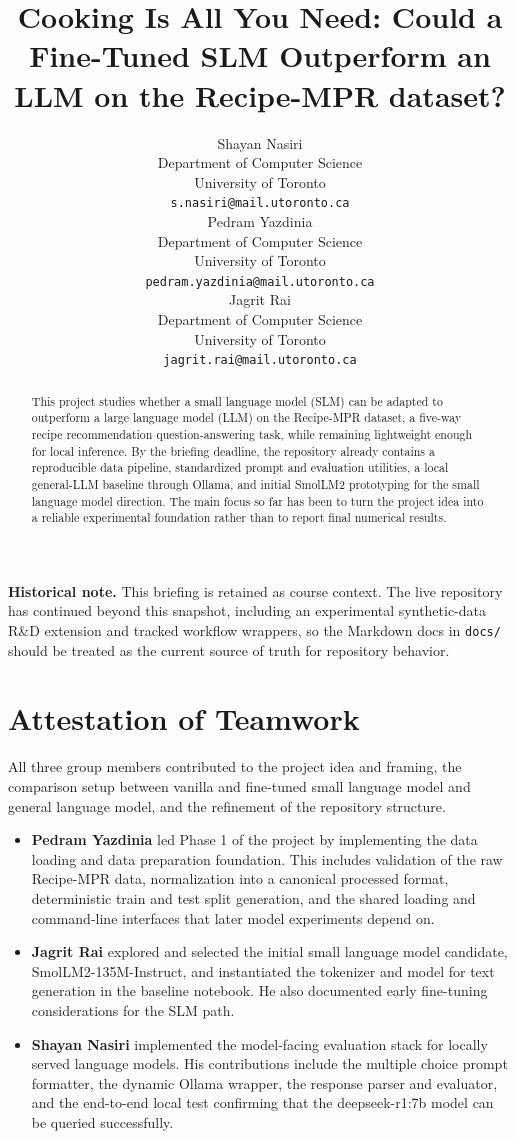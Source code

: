 \documentclass{article}
\title{Cooking Is All You Need: Could a Fine-Tuned SLM Outperform an LLM on the Recipe-MPR dataset?}
\author{%
  Shayan Nasiri\\
  Department of Computer Science\\
  University of Toronto\\
  \texttt{s.nasiri@mail.utoronto.ca} \\
  \And
  Pedram Yazdinia\\
  Department of Computer Science\\
  University of Toronto\\
  \texttt{pedram.yazdinia@mail.utoronto.ca} \\
  \AND
  Jagrit Rai\\
  Department of Computer Science\\
  University of Toronto\\
  \texttt{jagrit.rai@mail.utoronto.ca} \\
  \AND
}
\begin{document}
\maketitle


\begin{abstract}
This project studies whether a small language model (SLM) can be adapted to outperform a large language model (LLM) on the Recipe-MPR dataset,
a five-way recipe recommendation question-answering task, while remaining lightweight enough for local inference. By the briefing deadline, the repository already contains a reproducible data pipeline, standardized prompt and evaluation utilities, a local general-LLM baseline through Ollama, and initial SmolLM2 prototyping for the small language model direction. The main focus so far has been to turn the project idea into a reliable
experimental foundation rather than to report final numerical results.
\end{abstract}

\noindent\textbf{Historical note.} This briefing is retained as course context. The live repository has continued beyond this snapshot, including an experimental synthetic-data R\&D extension and tracked workflow wrappers, so the Markdown docs in \texttt{docs/} should be treated as the current source of truth for repository behavior.
%
%
%
%
%
%
\section*{Attestation of Teamwork}
All three group members contributed to the project idea and framing, the comparison setup between vanilla and fine-tuned small language model and general language model, and the refinement of the repository structure.

\begin{itemize}
    \item \textbf{Pedram Yazdinia} led Phase 1 of the project by implementing the data loading and data preparation foundation. This includes validation of the raw Recipe-MPR data, normalization into a canonical processed format, deterministic train and test split generation, and the shared loading and command-line interfaces that later model experiments depend on. 

    \item \textbf{Jagrit Rai} explored and selected the initial small language model candidate, SmolLM2-135M-Instruct, and instantiated the tokenizer and model for text generation in the baseline notebook. He also documented early fine-tuning considerations for the SLM path.

    \item \textbf{Shayan Nasiri} implemented the model-facing evaluation stack for locally served language models. His contributions include the multiple choice prompt formatter, the dynamic Ollama wrapper, the response parser and evaluator, and the end-to-end local test confirming that the deepseek-r1:7b model can be queried successfully.
\end{itemize}
%
%
%
%
%
%
\newpage
\end{document}
